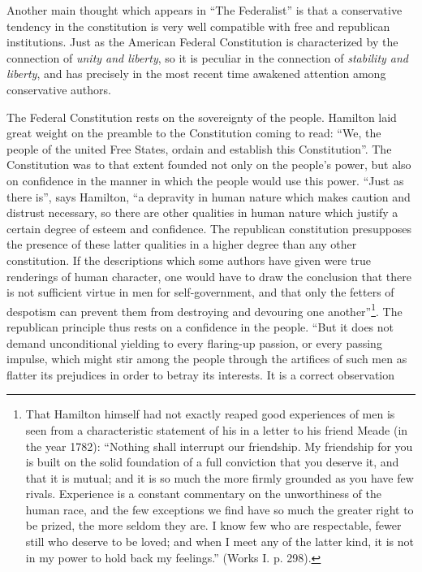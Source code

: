 \documentclass[12pt,a4paper,openany]{book}
\newcommand{\opage}[1]{\marginnote{\footnotesize\textit{[#1]}}}
\begin{document}
Another main thought which appears in ``The Federalist''
is that a conservative tendency in the constitution is very well
compatible with free and republican institutions. Just as
the American Federal Constitution is characterized by
the connection of \emph{unity and liberty}, so it is peculiar
in the connection of \emph{stability and liberty}, and has precisely in the
most recent time awakened attention among conservative authors.

The Federal Constitution rests on the sovereignty of the people.
Hamilton laid great weight on the preamble to
the Constitution coming to read: ``We, the people of the united Free States,
ordain and establish this Constitution''. The Constitution was to
that extent founded not only on the people's power, but also on
confidence in the manner in which the people would use this power.
``Just as there is'', says Hamilton, ``a depravity in
\opage{135}human nature which makes caution and distrust necessary,
so there are other qualities in human nature
which justify a certain degree of esteem and confidence. The
republican constitution presupposes the presence of these
latter qualities in a higher degree than any other
constitution. If the descriptions which some authors have
given were true renderings of human character,
one would have to draw the conclusion that there is not sufficient
virtue in men for self-government, and that only the
fetters of despotism can prevent them from destroying and devouring
one another''\footnote{That Hamilton himself had not exactly reaped good experiences of
men is seen from a characteristic statement of his in a letter to his
friend Meade (in the year 1782): ``Nothing shall interrupt our friendship. My
friendship for you is built on the solid foundation of a full
conviction that you deserve it, and that it is mutual; and it
is so much the more firmly grounded as you have few rivals.
Experience is a constant commentary on the unworthiness of the human race, and the few exceptions we find have so much the greater right
to be prized, the more seldom they are. I know few who are
respectable, fewer still who deserve to be loved; and when I meet
any of the latter kind, it is not in my power to hold back my
feelings.'' (Works I. p. 298).}. The republican principle thus rests on
a confidence in the people. ``But it does not demand unconditional yielding
to every flaring-up passion, or every passing
impulse, which might stir among the people through
the artifices of such men as flatter its prejudices
in order to betray its interests. It is a correct observation
\end{document}
